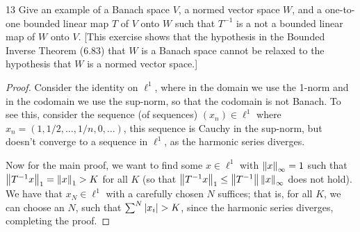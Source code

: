 \begin{exercise}{13}
Give an example of a Banach space $V$, a normed vector space $W$, and a one-to-one bounded linear map $T$ of $V$ onto $W$ such that $T^{-1}$ is a not a bounded linear map of $W$ onto $V$.
[This exercise shows that the hypothesis in the Bounded Inverse Theorem (6.83) that $W$ is a Banach space cannot be relaxed to the hypothesis that $W$ is a normed vector space.]
\end{exercise}
\begin{proof}
Consider the identity on $\ell^1$, where in the domain we use the 1-norm and in the codomain we use the sup-norm, so that the codomain is not Banach.
To see this, consider the sequence (of sequences) $(x_n) \in \ell^1$ where $x_n = (1, 1/2, \dots, 1/n, 0, \dots)$, this sequence is Cauchy in the sup-norm, but doesn't converge to a sequence in $\ell^1$, as the harmonic series diverges.

Now for the main proof, we want to find some $x \in \ell^1$ with $\left\lVert x\right\rVert_\infty = 1$ such that  $\left\lVert T^{-1}x\right\rVert_1 = \left\lVert x\right\rVert_1 > K$ for all $K$ (so that $\left\lVert T^{-1} x\right\rVert_1 \leq \left\lVert T^{-1}\right\rVert\left\lVert x\right\rVert_\infty$ does not hold).
We have that $x_N \in \ell^1$ with a carefully chosen $N$ suffices;
that is, for  all $K$, we can choose an $N$, such that $\sum^N \left\lvert x_i\right\rvert > K$, since the harmonic series diverges, completing the proof.
\end{proof} 

